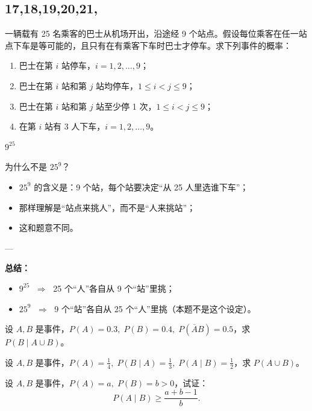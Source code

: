 \subsection{17,18,19,20,21,}
\begin{exercise}
一辆载有 25 名乘客的巴士从机场开出，沿途经 9 个站点。假设每位乘客在任一站点下车是等可能的，且只有在有乘客下车时巴士才停车。求下列事件的概率：
\begin{enumerate}
  \item 巴士在第 $i$ 站停车，$i=1,2,\dots,9$；
  \item 巴士在第 $i$ 站和第 $j$ 站均停车，$1 \leq i < j \leq 9$；
  \item 巴士在第 $i$ 站和第 $j$ 站至少停 1 次，$1 \leq i < j \leq 9$；
  \item 在第 $i$ 站有 3 人下车，$i=1,2,\dots,9$。
\end{enumerate}
\end{exercise}
\begin{dxtips}[谁做选择谁做指数]
  $
9^{25}$

为什么不是 $25^9$？

\begin{itemize}
  \item $25^9$ 的含义是：9 个站，每个站要决定“从 25 人里选谁下车”；
  \item 那样理解是“站点来挑人”，而不是“人来挑站”；
  \item 这和题意不同。
\end{itemize}

---

\textbf{总结：}
\begin{itemize}
  \item $9^{25}$ $\;\Rightarrow\;$ 25 个“人”各自从 9 个“站”里挑；
  \item $25^9$ $\;\Rightarrow\;$ 9 个“站”各自从 25 个“人”里挑（本题不是这个设定）。
\end{itemize}

\end{dxtips}
\begin{exercise}
设 $A,B$ 是事件，$P(A)=0.3,\; P(B)=0.4,\; P(\overline{A}B)=0.5$，求 $P(B \mid A \cup B)$。
\end{exercise}

\begin{exercise}
设 $A,B$ 是事件，$P(A)=\tfrac{1}{4},\; P(B \mid A)=\tfrac{1}{3},\; P(A \mid B)=\tfrac{1}{2}$，求 $P(A \cup B)$。
\end{exercise}

\begin{exercise}
设 $A,B$ 是事件，$P(A)=a,\; P(B)=b>0$，试证：
\[
P(A \mid B) \geq \frac{a+b-1}{b}.
\]
\end{exercise}

